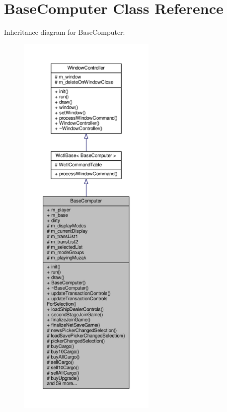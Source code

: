 \hypertarget{classBaseComputer}{}\section{Base\+Computer Class Reference}
\label{classBaseComputer}


Inheritance diagram for Base\+Computer\+:
\nopagebreak
\begin{figure}[H]
\begin{center}
\leavevmode
\includegraphics[height=550pt]{d0/df3/classBaseComputer__inherit__graph}
\end{center}
\end{figure}


